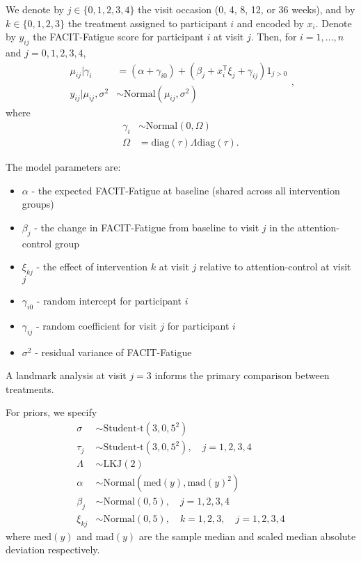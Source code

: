 \documentclass[
]{article}
\providecommand{\tightlist}{%
  \setlength{\itemsep}{0pt}\setlength{\parskip}{0pt}}
\begin{document}
We denote by $j\in\{0,1,2,3, 4\}$ the visit occasion (0, 4, 8, 12, or 36 weeks), and by $k\in\{0,1,2,3\}$ the treatment assigned to participant $i$ and encoded by $x_i$.
Denote by $y_{ij}$ the FACIT-Fatigue score for participant $i$ at visit $j$.
Then, for $i=1,...,n$ and $j=0,1,2,3,4$,
$$
\begin{aligned}
\mu_{ij}|\gamma_i &= (\alpha+\gamma_{i0}) + (\beta_j + x_i^\mathsf{T}\xi_{j} + \gamma_{ij})1_{j>0} \\
y_{ij}|\mu_{ij},\sigma^2 &\sim \text{Normal}\left(\mu_{ij}, \sigma^2\right)
\end{aligned},
$$
where
$$
\begin{aligned}
  \gamma_i &\sim \text{Normal}\left(0, \Omega\right) \\
  \Omega &= \text{diag}(\tau)\Lambda\text{diag}(\tau).
\end{aligned}
$$

The model parameters are:

\begin{itemize}
  \tightlist
  \item $\alpha$ - the expected FACIT-Fatigue at baseline (shared across all intervention groups)
  \item $\beta_j$ - the change in FACIT-Fatigue from baseline to visit $j$ in the attention-control group
  \item $\xi_{kj}$ - the effect of intervention $k$ at visit $j$ relative to attention-control at visit $j$
  \item $\gamma_{i0}$ - random intercept for participant $i$
  \item $\gamma_{ij}$ - random coefficient for visit $j$ for participant $i$
  \item $\sigma^2$ - residual variance of FACIT-Fatigue
\end{itemize}
A landmark analysis at visit $j=3$ informs the primary comparison between treatments.

For priors, we specify
$$
  \begin{aligned}
  \sigma &\sim \text{Student-t}(3, 0, 5^2) \\
  \tau_j &\sim \text{Student-t}(3, 0, 5^2),\quad j=1,2,3,4 \\
  \Lambda &\sim \text{LKJ}(2) \\
  \alpha &\sim \text{Normal}\left(\text{med}(y), \text{mad}(y)^2\right) \\
  \beta_j &\sim \text{Normal}\left(0, 5\right),\quad j=1,2,3,4 \\
  \xi_{kj} &\sim \text{Normal}(0, 5),\quad k=1,2,3,\quad j=1,2,3,4
\end{aligned}
$$
where $\text{med}(y)$ and $\text{mad}(y)$ are the sample median and scaled median absolute deviation respectively.
\end{document}
